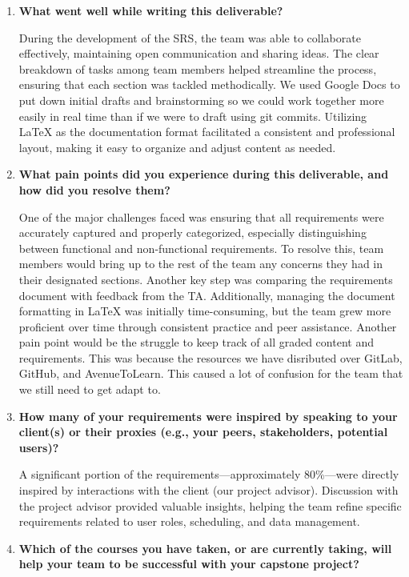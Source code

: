\begin{enumerate}
    \item \textbf{What went well while writing this deliverable?}
    
    During the development of the SRS, the team was able to collaborate effectively, maintaining open communication and sharing ideas. The clear breakdown of tasks among team members helped streamline the process, ensuring that each section was tackled methodically. We used Google Docs to put down initial drafts and brainstorming so we could work together more easily in real time than if we were to draft using git commits. Utilizing LaTeX as the documentation format facilitated a consistent and professional layout, making it easy to organize and adjust content as needed.

    \item \textbf{What pain points did you experience during this deliverable, and how did you resolve them?}
    
    One of the major challenges faced was ensuring that all requirements were accurately captured and properly categorized, especially distinguishing between functional and non-functional requirements. To resolve this, team members would bring up to the rest of the team any concerns they had in their designated sections. Another key step was comparing the requirements document with feedback from the TA. Additionally, managing the document formatting in LaTeX was initially time-consuming, but the team grew more proficient over time through consistent practice and peer assistance. Another pain point would be the struggle to keep track of all graded content and requirements. This was because the resources we have disributed over GitLab, GitHub, and AvenueToLearn. This caused a lot of confusion for the team that we still need to get adapt to.

    \item \textbf{How many of your requirements were inspired by speaking to your client(s) or their proxies (e.g., your peers, stakeholders, potential users)?}
    
    A significant portion of the requirements—approximately 80\%—were directly inspired by interactions with the client (our project advisor). Discussion with the project advisor provided valuable insights, helping the team refine specific requirements related to user roles, scheduling, and data management.

    \item \textbf{Which of the courses you have taken, or are currently taking, will help your team to be successful with your capstone project?}
    

\end{enumerate}
